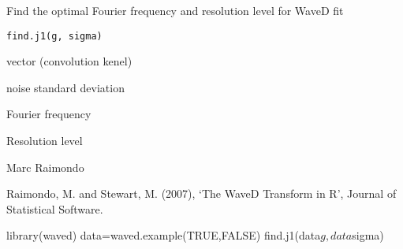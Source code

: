 \documentclass{article}
\begin{document}
\begin{Description}\relax
Find the optimal Fourier frequency and resolution
level for WaveD fit
\end{Description}
\begin{Usage}
\begin{verbatim}
find.j1(g, sigma)
\end{verbatim}
\end{Usage}
\begin{Arguments}
\begin{ldescription}
\item[\code{g}] vector (convolution kenel)
\item[\code{sigma}] noise standard deviation 
\end{ldescription}
\end{Arguments}
\begin{Value}
\begin{ldescription}
\item[\code{M}] Fourier frequency
\item[\code{j1}] Resolution level
\end{ldescription}
\end{Value}
\begin{Author}\relax
Marc Raimondo
\end{Author}
\begin{References}\relax
Raimondo, M. and Stewart, M. (2007),
`The WaveD Transform in R', Journal of Statistical Software.
\end{References}
\begin{SeeAlso}\relax
{}
\end{SeeAlso}
\begin{Examples}
\begin{ExampleCode}
library(waved)
data=waved.example(TRUE,FALSE)
find.j1(data$g,data$sigma)

\end{ExampleCode}
\end{Examples}
\end{document}
